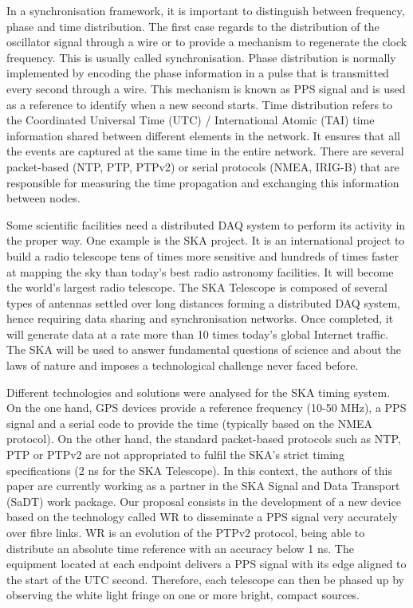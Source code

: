In a synchronisation framework, it is important to distinguish between frequency, phase and time distribution.
The first case regards to the distribution of the oscillator signal through a wire or to provide a mechanism to regenerate the clock frequency. This is usually  called synchronisation. Phase distribution is normally implemented by encoding the phase information in a pulse that is transmitted every second through a wire. This mechanism is known as PPS signal and is used as a reference to identify when a new second starts.
Time distribution refers to the Coordinated Universal Time (UTC) / International Atomic (TAI) time information shared between different elements in the network. It ensures that all the events are captured at the same time in the entire network. There are several packet-based (NTP, PTP, PTPv2) or serial protocols (NMEA, IRIG-B) that are responsible for measuring the time propagation and exchanging this information between nodes. 

Some scientific facilities need a distributed DAQ system to perform its activity in the proper way. One example is the SKA \cite{ska:project_website} project. It is an international project to build a radio telescope tens of times more sensitive and hundreds of times faster at mapping the sky than today's best radio astronomy facilities. It will become the world's largest radio telescope. The SKA Telescope is composed of several types of antennas settled over long distances forming a distributed DAQ system, hence requiring  data sharing and synchronisation networks. Once completed, it will generate data at a rate more than 10 times today's global Internet traffic. The SKA will be used to answer fundamental questions of science and about the laws of nature and imposes a technological challenge never faced before.

Different technologies and solutions were analysed for the SKA timing system. On the one hand, GPS devices provide a reference frequency (10-50 MHz), a PPS signal and a serial code to provide the time (typically based on the NMEA protocol). On the other hand, the standard packet-based protocols such as NTP, PTP or PTPv2 are not appropriated to fulfil the SKA's strict timing specifications (2 ns for the SKA Telescope).
In this context, the authors of this paper are currently working as a partner in the SKA Signal and Data Transport (SaDT) \cite{ska:sadt_website} work package. Our proposal consists in the development of a new device based on the technology called WR \cite{ohwr:wr_wiki} to disseminate a PPS signal very accurately over fibre links. WR is an evolution of the PTPv2 protocol, being able to distribute an absolute time reference with an accuracy below 1 ns. The equipment located at each endpoint delivers a PPS signal with its edge aligned to the start of the UTC second. Therefore, each telescope can then be phased up by observing the white light fringe on one or more bright, compact sources.

